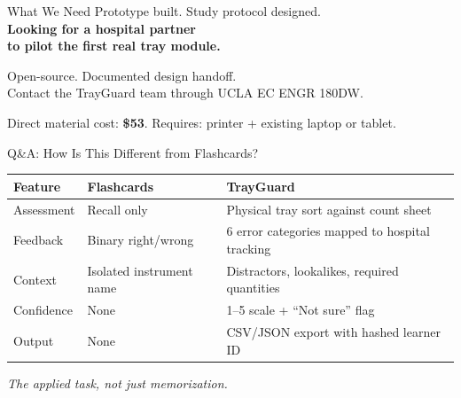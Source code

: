 \documentclass[10pt,aspectratio=169]{beamer}
\newcommand{\takeaway}[1]{%
  \vspace{0.25cm}
  \begin{center}\textit{\small #1}\end{center}
}
\begin{document}
\begin{frame}{What We Need}
  \centering
  \vspace{0.8cm}
  {\Large Prototype built. Study protocol designed.}\\[1.2cm]
  {\large\bfseries Looking for a hospital partner\\to pilot the first real tray module.}\\[1.2cm]
  \begin{block}{}
    \centering
    Open-source. Documented design handoff.\\[0.3cm]
    \small Contact the TrayGuard team through UCLA EC ENGR 180DW.
  \end{block}
  \vspace{0.6cm}
  {\footnotesize Direct material cost: \textbf{\$53}. Requires: printer + existing laptop or tablet.}
\end{frame}


\begin{frame}{Q\&A: How Is This Different from Flashcards?}
  \vspace{0.2cm}
  \footnotesize
  \begin{tabularx}{\textwidth}{l X X}
    \toprule
    Feature & Flashcards & TrayGuard \\
    \midrule
    Assessment & Recall only & Physical tray sort against count sheet \\
    Feedback & Binary right/wrong & 6 error categories mapped to hospital tracking \\
    Context & Isolated instrument name & Distractors, lookalikes, required quantities \\
    Confidence & None & 1--5 scale + ``Not sure'' flag \\
    Output & None & CSV/JSON export with hashed learner ID \\
    \bottomrule
  \end{tabularx}
  \vspace{0.3cm}
  \takeaway{The applied task, not just memorization.}
\end{frame}
\end{document}
